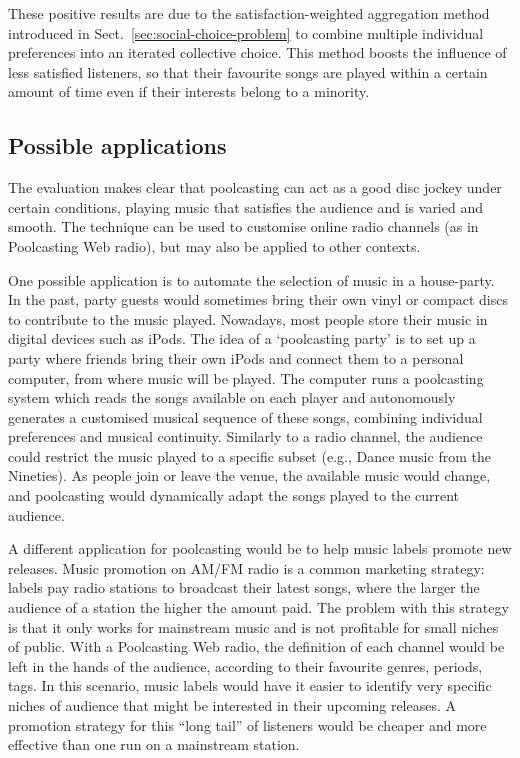 These positive results are due to the satisfaction-weighted aggregation method introduced in Sect.~\ref{sec:social-choice-problem} to combine multiple individual preferences into an iterated collective choice.
This method boosts the influence of less satisfied listeners, so that their favourite songs are played within a certain amount of time even if their interests belong to a minority.

\subsection{Possible applications} %

The evaluation makes clear that poolcasting can act as a good disc jockey under certain conditions, playing music that satisfies the audience and is varied and smooth.
The technique can be used to customise online radio channels (as in Poolcasting Web radio), but may also be applied to other contexts.

One possible application is to automate the selection of music in a house-party.
In the past, party guests would sometimes bring their own vinyl or compact discs to contribute to the music played.
Nowadays, most people store their music in digital devices such as iPods.
The idea of a `poolcasting party' is to set up a party where friends bring their own iPods and connect them to a personal computer, from where music will be played.
The computer runs a poolcasting system which reads the songs available on each player and autonomously generates a customised musical sequence of these songs, combining individual preferences and musical continuity. 
Similarly to a radio channel, the audience could restrict the music played to a specific subset (e.g., Dance music from the Nineties). %
As people join or leave the venue, the available music would change, and poolcasting would dynamically adapt the songs played to the current audience.

A different application for poolcasting would be to help music labels promote new releases. 
Music promotion on AM/FM radio is a common marketing strategy: labels pay radio stations to broadcast their latest songs, where the larger the audience of a station the higher the amount paid.
The problem with this strategy is that it only works for mainstream music and is not profitable for small niches of public.
With a Poolcasting Web radio, the definition of each channel would be left in the hands of the audience, according to their favourite genres, periods, tags.
In this scenario, music labels would have it easier to identify very specific niches of audience that might be interested in their upcoming releases. 
A promotion strategy for this ``long tail'' \cite{Anderson04} of listeners would be cheaper and more effective than one run on a mainstream station.

